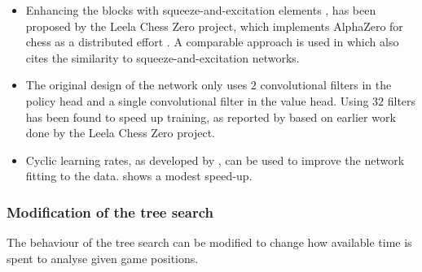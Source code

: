 \documentclass[12pt,onecolumn,oneside,titlepage]{article}
\begin{document}
\begin{itemize}
 \item Enhancing the blocks with squeeze-and-excitation elements \cite{hu2018squeeze}, has been proposed by the Leela Chess Zero project, which implements AlphaZero for chess as a distributed effort \cite{leela0sq}.
       A comparable approach is used in \cite{wu2019accelerating} which also cites the similarity to squeeze-and-excitation networks.
 \item The original design of the network only uses $2$ convolutional filters in the policy head and a single convolutional filter in the value head. 
 Using $32$ filters has been found to speed up training, as reported by \cite{oracledevs6} based on earlier work done by the Leela Chess Zero project.
 \item Cyclic learning rates, as developed by \cite{smith2017cyclical}, can be used to improve the network fitting to the data. \cite{oracledevs6} shows a modest speed-up.
\end{itemize}

\subsubsection{Modification of the tree search}

The behaviour of the tree search can be modified to change how available time is spent to analyse given game positions.
\end{document}
